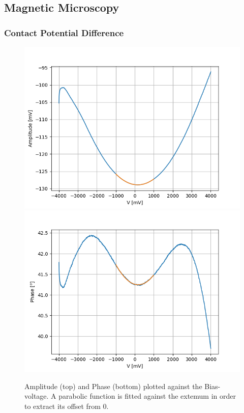 \documentclass[%
 reprint,
amsmath,amssymb,
pra,
]{revtex4-1}
\begin{document}
\subsection{Magnetic Microscopy}

\subsubsection{Contact Potential Difference}

\begin{figure}[h]
\centering
\includegraphics[scale=0.5]{Bilder/Magnetic/amplitude.PNG}
\includegraphics[scale=0.5]{Bilder/Magnetic/phase.PNG}
\caption{Amplitude (top) and Phase (bottom) plotted against the Bias-voltage. A parabolic function is fitted against the extemum in order to extract its offset from 0.}
\label{fig:bias}
\end{figure}
\end{document}
